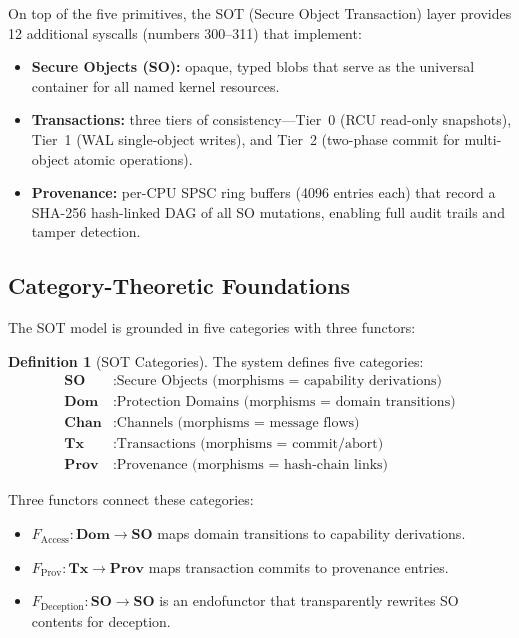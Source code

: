 \documentclass[11pt,a4paper,twoside]{report}
\theoremstyle{definition}
\newtheorem{definition}{Definition}[chapter]
\begin{document}
On top of the five primitives, the SOT (Secure Object Transaction) layer
provides 12 additional syscalls (numbers 300--311) that implement:

\begin{itemize}[leftmargin=1.4em]
  \item \textbf{Secure Objects (SO):} opaque, typed blobs that serve as the
    universal container for all named kernel resources.
  \item \textbf{Transactions:} three tiers of consistency---Tier~0 (RCU
    read-only snapshots), Tier~1 (WAL single-object writes), and Tier~2
    (two-phase commit for multi-object atomic operations).
  \item \textbf{Provenance:} per-CPU SPSC ring buffers (4096 entries each)
    that record a SHA-256 hash-linked DAG of all SO mutations, enabling
    full audit trails and tamper detection.
\end{itemize}

\subsection{Category-Theoretic Foundations}

The SOT model is grounded in five categories with three functors:

\begin{definition}[SOT Categories]
The system defines five categories:
\begin{align}
  \mathbf{SO}   &: \text{Secure Objects (morphisms = capability derivations)} \\
  \mathbf{Dom}  &: \text{Protection Domains (morphisms = domain transitions)} \\
  \mathbf{Chan} &: \text{Channels (morphisms = message flows)} \\
  \mathbf{Tx}   &: \text{Transactions (morphisms = commit/abort)} \\
  \mathbf{Prov} &: \text{Provenance (morphisms = hash-chain links)}
\end{align}
\end{definition}

Three functors connect these categories:
\begin{itemize}[leftmargin=1.4em]
  \item $F_{\text{Access}} : \mathbf{Dom} \to \mathbf{SO}$ maps domain
    transitions to capability derivations.
  \item $F_{\text{Prov}} : \mathbf{Tx} \to \mathbf{Prov}$ maps transaction
    commits to provenance entries.
  \item $F_{\text{Deception}} : \mathbf{SO} \to \mathbf{SO}$ is an
    endofunctor that transparently rewrites SO contents for deception.
\end{itemize}
\end{document}
